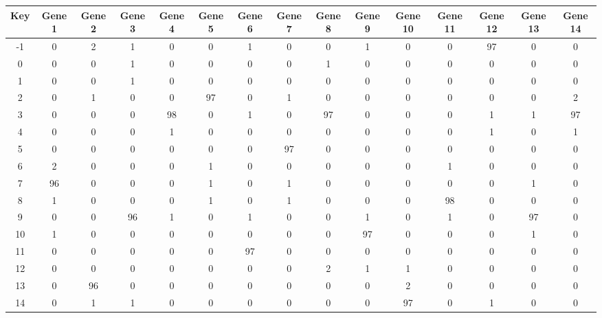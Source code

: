 \begin{tabular}{|c|c|c|c|c|c|c|c|c|c|c|c|c|c|c|}
\hline
Key & Gene 1 & Gene 2 & Gene 3 & Gene 4 & Gene 5 & Gene 6 & Gene 7 & Gene 8 & Gene 9 & Gene 10 & Gene 11 & Gene 12 & Gene 13 & Gene 14 \\
\hline
-1 & 0 & 2 & 1 & 0 & 0 & 1 & 0 & 0 & 1 & 0 & 0 & 97 & 0 & 0 \\
0 & 0 & 0 & 1 & 0 & 0 & 0 & 0 & 1 & 0 & 0 & 0 & 0 & 0 & 0 \\
1 & 0 & 0 & 1 & 0 & 0 & 0 & 0 & 0 & 0 & 0 & 0 & 0 & 0 & 0 \\
2 & 0 & 1 & 0 & 0 & 97 & 0 & 1 & 0 & 0 & 0 & 0 & 0 & 0 & 2 \\
3 & 0 & 0 & 0 & 98 & 0 & 1 & 0 & 97 & 0 & 0 & 0 & 1 & 1 & 97 \\
4 & 0 & 0 & 0 & 1 & 0 & 0 & 0 & 0 & 0 & 0 & 0 & 1 & 0 & 1 \\
5 & 0 & 0 & 0 & 0 & 0 & 0 & 97 & 0 & 0 & 0 & 0 & 0 & 0 & 0 \\
6 & 2 & 0 & 0 & 0 & 1 & 0 & 0 & 0 & 0 & 0 & 1 & 0 & 0 & 0 \\
7 & 96 & 0 & 0 & 0 & 1 & 0 & 1 & 0 & 0 & 0 & 0 & 0 & 1 & 0 \\
8 & 1 & 0 & 0 & 0 & 1 & 0 & 1 & 0 & 0 & 0 & 98 & 0 & 0 & 0 \\
9 & 0 & 0 & 96 & 1 & 0 & 1 & 0 & 0 & 1 & 0 & 1 & 0 & 97 & 0 \\
10 & 1 & 0 & 0 & 0 & 0 & 0 & 0 & 0 & 97 & 0 & 0 & 0 & 1 & 0 \\
11 & 0 & 0 & 0 & 0 & 0 & 97 & 0 & 0 & 0 & 0 & 0 & 0 & 0 & 0 \\
12 & 0 & 0 & 0 & 0 & 0 & 0 & 0 & 2 & 1 & 1 & 0 & 0 & 0 & 0 \\
13 & 0 & 96 & 0 & 0 & 0 & 0 & 0 & 0 & 0 & 2 & 0 & 0 & 0 & 0 \\
14 & 0 & 1 & 1 & 0 & 0 & 0 & 0 & 0 & 0 & 97 & 0 & 1 & 0 & 0 \\
\hline
\end{tabular}